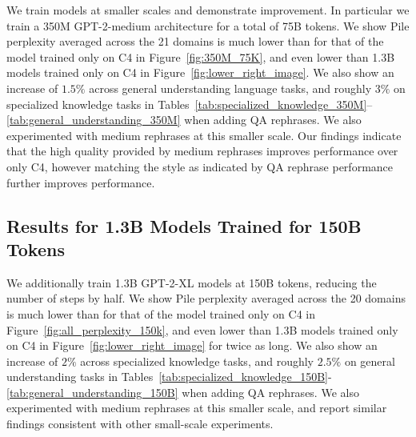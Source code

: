 \begin{table}[t]
    \centering
    \caption{Evaluation of 350M parameter LLMs trained for 75B tokens on General Understanding Tasks. This table shows the performance across various datasets, focusing on general reasoning, language understanding, and common sense comparing training .}
    \label{tab:general_understanding_350M}
\end{table}

We train models at smaller scales and demonstrate improvement. In particular we train a 350M GPT-2-medium architecture for a total of 75B tokens.  We show Pile perplexity averaged across the 21 domains is much lower than for that of the model trained only on C4 in Figure~\ref{fig:350M_75K}, and even lower than 1.3B models trained only on C4 in Figure~\ref{fig:lower_right_image}.  We also show an increase of $1.5\%$  across general understanding language tasks, and roughly $3\%$ on specialized knowledge tasks in Tables~\ref{tab:specialized_knowledge_350M}--\ref{tab:general_understanding_350M} when adding QA rephrases. We also experimented with medium rephrases at this smaller scale. Our findings indicate that the high quality provided by medium rephrases improves performance over only C4, however matching the style as indicated by QA rephrase performance further improves performance.

\subsection{Results for 1.3B Models Trained for 150B Tokens}

We additionally train 1.3B GPT-2-XL models at 150B tokens, reducing the number of steps by half.  We show Pile perplexity averaged across the 20 domains is much lower than for that of the model trained only on C4 in Figure~\ref{fig:all_perplexity_150k}, and even lower than 1.3B models trained only on C4 in Figure~\ref{fig:lower_right_image} for twice as long.  We also show an increase of $2\%$  across specialized knowledge tasks, and roughly $2.5\%$ on general understanding tasks in Tables~\ref{tab:specialized_knowledge_150B}-\ref{tab:general_understanding_150B} when adding QA rephrases. We also experimented with medium rephrases at this smaller scale, and report similar findings consistent with other small-scale experiments.

